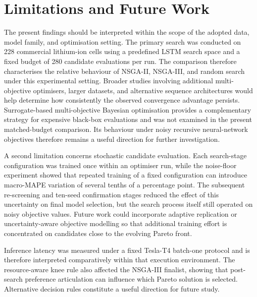 \documentclass[a4paper,fleqn]{cas-sc}
\begin{document}

\section{Limitations and Future Work}
\label{sec:limitations}

The present findings should be interpreted within the scope of the adopted
data, model family, and optimisation setting. The primary search was conducted
on 228 commercial lithium-ion cells using a predefined LSTM search space and
a fixed budget of 280 candidate evaluations per run. The comparison therefore
characterises the relative behaviour of NSGA-II, NSGA-III, and random search
under this experimental setting. Broader studies involving additional
multi-objective optimisers, larger datasets, and alternative sequence
architectures would help determine how consistently the observed convergence
advantage persists. Surrogate-based multi-objective Bayesian optimisation
provides a complementary strategy for expensive black-box evaluations
\cite{paria2020mobo} and was not examined in the present matched-budget
comparison. Its behaviour under noisy recursive neural-network objectives
therefore remains a useful direction for further investigation.

A second limitation concerns stochastic candidate evaluation. Each
search-stage configuration was trained once within an optimiser run, while the
noise-floor experiment showed that repeated training of a fixed configuration
can introduce macro-MAPE variation of several tenths of a percentage point.
The subsequent re-screening and ten-seed confirmation stages reduced the
effect of this uncertainty on final model selection, but the search process
itself still operated on noisy objective values. Future work could incorporate
adaptive replication or uncertainty-aware objective modelling so that
additional training effort is concentrated on candidates close to the
evolving Pareto front.

Inference latency was measured under a fixed Tesla-T4 batch-one protocol and
is therefore interpreted comparatively within that execution environment.
The resource-aware knee rule also affected the NSGA-III finalist, showing
that post-search preference articulation can influence which Pareto solution
is selected. Alternative decision rules constitute a useful direction for
future study.
\end{document}
